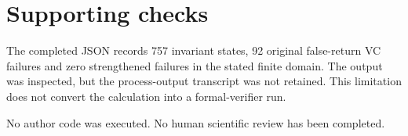 \documentclass[10pt]{article}
\begin{document}
\section*{Supporting checks}
The completed JSON records 757 invariant states, 92 original false-return VC failures and zero strengthened failures in the stated finite domain. The output was inspected, but the process-output transcript was not retained. This limitation does not convert the calculation into a formal-verifier run.\par
No author code was executed. No human scientific review has been completed.\par
\end{document}
